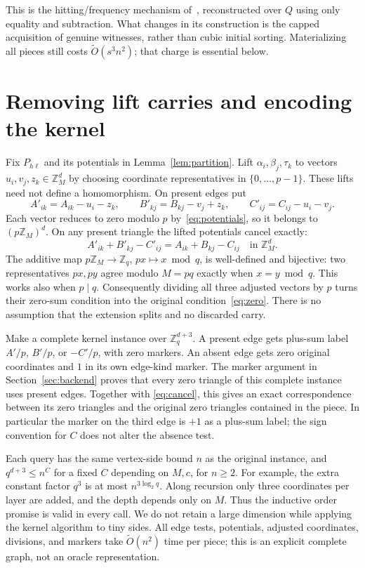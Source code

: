 \documentclass[manuscript,screen,nonacm,11pt]{acmart}
\newcommand{\Z}{\mathbb Z}
\newcommand{\Ot}{\widetilde O}
\begin{document}
This is the hitting/frequency mechanism of~\cite[Theorem~5.1]{CVX23},
reconstructed over $Q$ using only equality and subtraction. What changes
in its construction is the capped acquisition of genuine witnesses, rather
than cubic initial sorting. Materializing all pieces still costs
$\Ot(s^3n^2)$; that charge is essential below.

\section{Removing lift carries and encoding the kernel}\label{sec:kernel}

Fix $P_{h\ell}$ and its potentials in Lemma~\ref{lem:partition}.
Lift $\alpha_i,\beta_j,\tau_k$ to vectors $u_i,v_j,z_k\in\Z_M^d$
by choosing coordinate representatives in $\{0,\ldots,p-1\}$.
These lifts need not define a homomorphism. On present edges put
\begin{equation}\label{eq:adjust}
 A'_{ik}=A_{ik}-u_i-z_k,\qquad
 B'_{kj}=B_{kj}-v_j+z_k,\qquad
 C'_{ij}=C_{ij}-u_i-v_j.
\end{equation}
Each vector reduces to zero modulo $p$ by~\eqref{eq:potentials}, so it
belongs to $(p\Z_M)^d$. On any present triangle the lifted potentials
cancel exactly:
\begin{equation}\label{eq:cancel}
 A'_{ik}+B'_{kj}-C'_{ij}=A_{ik}+B_{kj}-C_{ij}\quad\text{in }\Z_M^d.
\end{equation}
The additive map $p\Z_M\longrightarrow\Z_q$, $px\mapsto x\bmod q$,
is well-defined and bijective: two representatives $px,py$ agree modulo
$M=pq$ exactly when $x=y\bmod q$. This works also when $p\mid q$.
Consequently dividing all three adjusted vectors by $p$ turns their
zero-sum condition into the original condition~\eqref{eq:zero}.
There is no assumption that the extension splits and no discarded carry.

Make a complete kernel instance over $\Z_q^{d+3}$. A present edge gets
plus-sum label $A'/p$, $B'/p$, or $-C'/p$, with zero markers. An absent
edge gets zero original coordinates and $1$ in its own edge-kind marker.
The marker argument in Section~\ref{sec:backend} proves that every zero
triangle of this complete instance uses present edges. Together with
\eqref{eq:cancel}, this gives an exact correspondence between its zero
triangles and the original zero triangles contained in the piece.
In particular the marker on the third edge is $+1$ as a plus-sum label;
the sign convention for $C$ does not alter the absence test.

Each query has the same vertex-side bound $n$ as the original instance,
and $q^{d+3}\le n^C$ for a fixed $C$ depending on $M,c$, for $n\ge2$.
For example, the extra constant factor $q^3$ is at most
$n^{3\log_2 q}$. Along recursion only three coordinates per layer are
added, and the depth depends only on $M$. Thus the inductive order promise
is valid in every call. We do not retain a large dimension while applying
the kernel algorithm to tiny sides. All edge tests, potentials, adjusted
coordinates, divisions, and markers take $\Ot(n^2)$ time per piece;
this is an explicit complete graph, not an oracle representation.
\end{document}
